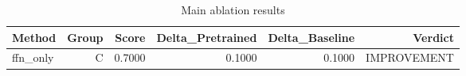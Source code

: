 \begin{table}[htbp]
\centering
\caption{Main ablation results}
\label{tab:main-results}
\begin{tabular}{lrrrrr}
\toprule
\textbf{Method} & \textbf{Group} & \textbf{Score} & \textbf{Delta\_Pretrained} & \textbf{Delta\_Baseline} & \textbf{Verdict} \\
\midrule
ffn\_only & C & 0.7000 & 0.1000 & 0.1000 & IMPROVEMENT \\
\bottomrule
\end{tabular}
\end{table}